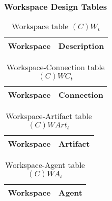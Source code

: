 \subsubsection{Workspace Design Tables}

\begin{table}[H]
	\centering
	\begin{tabular}{|p{4cm}|p{8cm}|}
			\hline
			\textbf{Workspace} & \textbf{Description} \\
			\hline
			\hline
		\end{tabular}
	\caption{Workspace table $(C)W_t$}
	\label{tab:cwt}
\end{table}

\begin{table}[H]
	\centering
	\begin{tabular}{|p{4cm}|p{8cm}|}
			\hline
			\textbf{Workspace} & \textbf{Connection} \\
			\hline
			\hline
		\end{tabular}
	\caption{Workspace-Connection table $(C)WC_t$}
	\label{tab:cwct}
\end{table}

\begin{table}[H]
	\centering
	\begin{tabular}{|p{4cm}|p{8cm}|}
			\hline
			\textbf{Workspace} & \textbf{Artifact} \\
			\hline
			\hline
		\end{tabular}
	\caption{Workspace-Artifact table $(C)WArt_t$}
	\label{tab:cwartt}
\end{table}

\begin{table}[H]
	\centering
	\begin{tabular}{|p{4cm}|p{8cm}|}
			\hline
			\textbf{Workspace} & \textbf{Agent} \\
			\hline
			\hline
		\end{tabular}
	\caption{Workspace-Agent table $(C)WA_t$}
	\label{tab:cwat}
\end{table}
